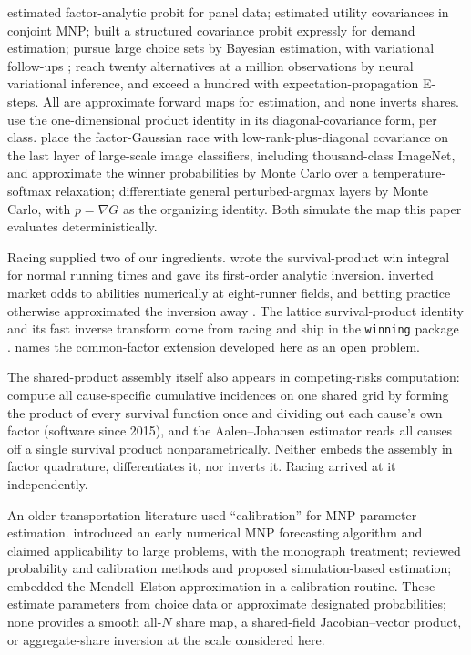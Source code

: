 \documentclass[12pt]{article}
\theoremstyle{remark}
\begin{document}
\citet{elrod1995}
estimated factor-analytic probit for panel data;
\citet{haaijer1998} estimated utility covariances in conjoint MNP;
\citet{cohen2010} built a structured covariance probit expressly for
demand estimation;
\citet{loaiza2022} pursue large choice sets by
Bayesian estimation, with variational follow-ups \citep{loaiza2023};
\citet{kim2026} reach twenty alternatives at a million observations by
neural variational inference, and \citet{ding2024} exceed a hundred with
expectation-propagation E-steps. All are approximate forward maps for
estimation, and none inverts shares. \citet{girolami2006} use the
one-dimensional product identity in its diagonal-covariance form,
per class. \citet{collier2021} place the factor-Gaussian race with
low-rank-plus-diagonal covariance on the last layer of large-scale image
classifiers, including thousand-class ImageNet, and approximate the
winner probabilities by Monte Carlo over a temperature-softmax
relaxation; \citet{berthet2020} differentiate general perturbed-argmax
layers by Monte Carlo, with $p = \nabla G$ as the organizing identity.
Both simulate the map this paper evaluates deterministically.

Racing supplied two of our ingredients. \citet{henery1981} wrote the
survival-product win integral for normal running times and gave its
first-order analytic inversion. \citet{ali1998} inverted market odds to
abilities numerically at eight-runner fields, and betting practice
otherwise approximated the inversion away \citep{lo1994}. The lattice survival-product identity and
its fast inverse transform come from racing \citep{cotton2021} and ship in
the \texttt{winning} package \citep{winningpkg}. \citet{cotton2021}
names the common-factor extension developed here as an open problem.

The shared-product assembly itself also appears in competing-risks
computation: \citet{mahani2019} compute all cause-specific cumulative
incidences on one shared grid by forming the product of every survival
function once and dividing out each cause's own factor (software since
2015), and the Aalen--Johansen estimator \citep{aalen1978} reads all
causes off a single survival product nonparametrically. Neither embeds
the assembly in factor quadrature, differentiates it, nor inverts it.
Racing arrived at it independently.

An older transportation literature used ``calibration'' for MNP
parameter estimation. \citet{daganzo1977} introduced an early numerical
MNP forecasting algorithm and claimed applicability to large problems,
with \citet{daganzo1979} the monograph treatment;
\citet{sheffi1982} reviewed probability and calibration methods and
proposed simulation-based estimation; \citet{kamakura1989} embedded the
Mendell--Elston approximation in a calibration routine. These estimate
parameters from choice data or approximate designated probabilities;
none provides a smooth all-$N$ share map, a shared-field
Jacobian--vector product, or aggregate-share inversion at the scale
considered here.
\end{document}
